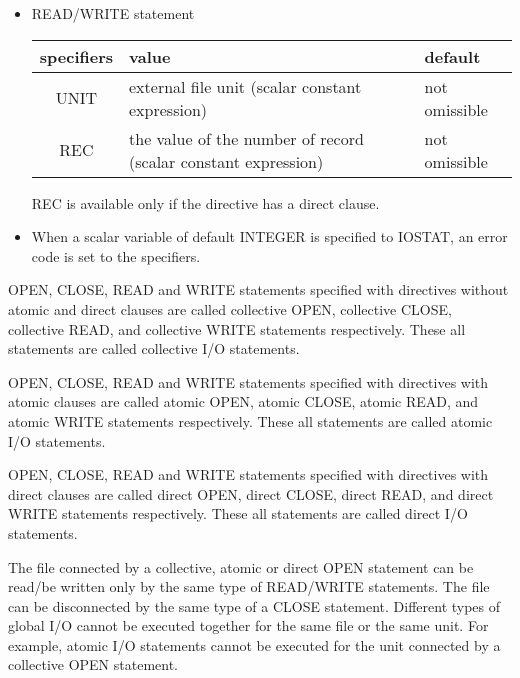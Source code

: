 \begin{itemize}
    \item READ/WRITE statement

   \begin{table}[h]
    \begin{center}
     \label{tb:globalopen}
     \begin{tabular}{|c||p{90mm}|l|}
       \hline
      specifiers & value & default \\ \hline \hline
      UNIT & external file unit (scalar constant expression)
      & not omissible \\ \hline
      REC & the value of the number of record (scalar constant expression)
      & not omissible \\ \hline
     \end{tabular}
    \end{center}
   \end{table}

   REC is available only if the directive has a direct clause.
   
   \item When a scalar variable of default INTEGER is specified to IOSTAT, an
     error code is set to the specifiers.
	 
   \end{itemize}

   OPEN, CLOSE, READ and WRITE statements specified with \gio directives
   without atomic and direct clauses are called collective OPEN, collective
   CLOSE, collective READ, and collective WRITE statements respectively.
   These all statements are called collective I/O statements.

   OPEN, CLOSE, READ and WRITE statements specified with \gio directives
   with atomic clauses are called atomic OPEN, atomic CLOSE, atomic READ, and
   atomic WRITE statements respectively.
   These all statements are called atomic I/O statements.

   OPEN, CLOSE, READ and WRITE statements specified with \gio directives
   with direct clauses are called direct OPEN, direct CLOSE, direct READ, and
   direct WRITE statements respectively.
   These all statements are called direct I/O statements.

   The file connected by a collective, atomic or direct OPEN statement can
   be read/be written only by the same type of READ/WRITE statements.
   The file can be disconnected by the same type of a CLOSE statement.
   Different types of global I/O cannot be executed together for the same file or the
   same unit.
   For example, atomic I/O statements cannot be executed for the unit
   connected by a collective OPEN statement.

